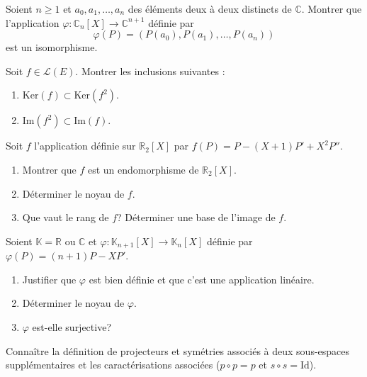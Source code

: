 \documentclass[a4paper,twoside,french,11pt]{VcCours}
\begin{document}
\begin{Exercice}{}
  Soient $n \geq 1$ et $a_{0} ,a_{1} , \ldots ,a_{n}$ des éléments deux à deux distincts de $\mathbb{C}$. Montrer que l'application $\varphi \colon \mathbb{C}_n[X] \rightarrow \mathbb{C}^{n+1}$ définie par
  \[\varphi(P) = (P(a_{0}),P(a_{1}), \ldots ,P(a_{n}))\]
  est un isomorphisme.
\end{Exercice} 
    
\begin{Exercice}{}
  Soit $f \in \mathcal{L}(E)$. Montrer les inclusions suivantes :
  
  \begin{enumerate}
    \item $\textrm{Ker}(f) \subset \textrm{Ker}(f^2)$.
    \item $\textrm{Im}(f^2) \subset \textrm{Im}(f)$.
  \end{enumerate}
\end{Exercice} 

\begin{Exercice}{}
  Soit $f$ l'application définie sur $\mathbb{R}_2[X]$ par $f(P)=P-(X+1)P'+X^2 P''$.
  \begin{enumerate}
    \item Montrer que $f$ est un endomorphisme de $\mathbb{R}_2[X]$.
    \item Déterminer le noyau de $f$.
    \item Que vaut le rang de $f$? Déterminer une base de l'image de $f$.
  \end{enumerate}
\end{Exercice} 
  
\begin{Exercice}{}
  Soient $\mathbb{K}= \mathbb{R}$ ou $\mathbb{C}$ et $\varphi : \mathbb{K}_{n+1}[X]\rightarrow \mathbb{K}_{n}[X]$ définie par $\varphi(P) = (n + 1)P - XP'$.
  \begin{enumerate}
    \item
    Justifier que $\varphi$ est bien définie et que c'est une application linéaire.
    \item
    Déterminer le noyau de $\varphi$.
    \item
    $\varphi$ est-elle surjective?
  \end{enumerate}
\end{Exercice} 

\begin{ptc}{}
	Connaître la définition de projecteurs et symétries associés à deux sous-espaces supplémentaires et les caractérisations associées ($p \circ p = p$ et $s \circ s = \textrm{Id}$).
\end{ptc} 
\end{document}
